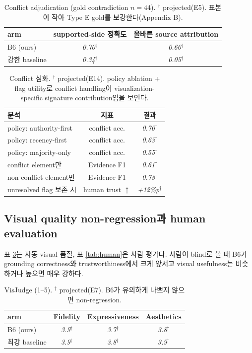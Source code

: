 \documentclass[11pt]{article}
\newcommand{\proj}[1]{\textit{#1}$^\dagger$}
\begin{document}
\begin{table}[h]
\centering\small
\begin{tabular}{lcc}
\toprule
arm & supported-side 정확도 & 올바른 source attribution \\
\midrule
B6 (ours) & \proj{0.70} & \proj{0.66} \\
강한 baseline & \proj{0.34} & \proj{0.05} \\
\bottomrule
\end{tabular}
\caption{Conflict adjudication (gold contradiction $n{=}44$). $^\dagger$ projected(E5). 표본이
작아 Type E gold를 보강한다(Appendix B).}
\label{tab:conflict}
\end{table}

\begin{table}[h]
\centering\small
\begin{tabular}{lcc}
\toprule
분석 & 지표 & 결과 \\
\midrule
policy: authority-first & conflict acc. & \proj{0.70} \\
policy: recency-first & conflict acc. & \proj{0.63} \\
policy: majority-only & conflict acc. & \proj{0.55} \\
conflict element만 & Evidence F1 & \proj{0.61} \\
non-conflict element만 & Evidence F1 & \proj{0.78} \\
unresolved flag 보존 시 & human trust $\uparrow$ & \proj{+12\%p} \\
\bottomrule
\end{tabular}
\caption{Conflict 심화. $^\dagger$ projected(E14). policy ablation + flag utility로 conflict
handling이 visualization-specific signature contribution임을 보인다.}
\label{tab:conflictdeep}
\end{table}

\subsection{Visual quality non-regression과 human evaluation}
표 \ref{tab:visjudge}는 자동 visual 품질, 표 \ref{tab:human}은 사람 평가다. 사람이 blind로 볼 때
B6가 grounding correctness와 trustworthiness에서 크게 앞서고 visual usefulness는 비슷하거나 높으면
매우 강하다.

\begin{table}[h]
\centering\small
\begin{tabular}{lccc}
\toprule
arm & Fidelity & Expressiveness & Aesthetics \\
\midrule
B6 (ours) & \proj{3.9} & \proj{3.7} & \proj{3.8} \\
최강 baseline & \proj{3.9} & \proj{3.8} & \proj{3.9} \\
\bottomrule
\end{tabular}
\caption{VisJudge (1--5). $^\dagger$ projected(E7). B6가 유의하게 나쁘지 않으면 non-regression.}
\label{tab:visjudge}
\end{table}
\end{document}
